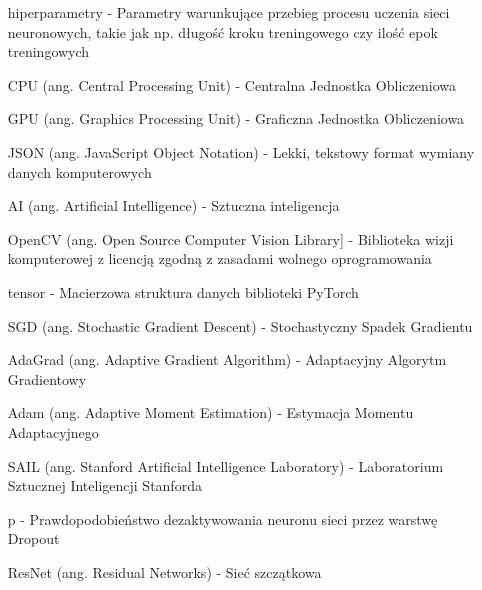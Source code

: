 \begin{itemize}
    \item[hiperparametry] - Parametry warunkujące przebieg procesu uczenia sieci neuronowych,
    takie jak np. długość kroku treningowego czy ilość epok treningowych
    \item[CPU] (ang. Central Processing Unit) - Centralna Jednostka Obliczeniowa
    \item[GPU] (ang. Graphics Processing Unit) - Graficzna Jednostka Obliczeniowa
    \item[JSON] (ang. JavaScript Object Notation) - Lekki, tekstowy format wymiany danych komputerowych
    \item[AI] (ang. Artificial Intelligence) - Sztuczna inteligencja
    \item[OpenCV] (ang. Open Source Computer Vision Library] - Biblioteka wizji komputerowej z licencją zgodną z zasadami wolnego oprogramowania
    \item[tensor] - Macierzowa struktura danych biblioteki PyTorch
    \item[SGD] (ang. Stochastic Gradient Descent) - Stochastyczny Spadek Gradientu
    \item[AdaGrad] (ang. Adaptive Gradient Algorithm) - Adaptacyjny Algorytm Gradientowy
    \item[Adam] (ang. Adaptive Moment Estimation) - Estymacja Momentu Adaptacyjnego
    \item[SAIL] (ang. Stanford Artificial Intelligence Laboratory) - Laboratorium Sztucznej Inteligencji Stanforda
    \item[p] - Prawdopodobieństwo dezaktywowania neuronu sieci przez warstwę Dropout
    \item[ResNet] (ang. Residual Networks) - Sieć szczątkowa

  \end{itemize}
